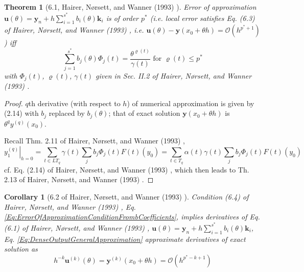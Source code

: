 \documentclass[10pt]{amsart}
\newtheorem{theorem}{Theorem}
\newtheorem{corollary}{Corollary}
\begin{document}
\begin{multicols*}{2}
\begin{theorem}[6.1, Hairer, N\o rsett, and Wanner (1993) \cite{HNW1993}]
Error of approximation $\mathbf{u}(\theta) = \mathbf{y}_n + h\sum_{i=1}^{s^*} b_i(\theta) \mathbf{k}_i$ is of order $p^*$ (i.e. local error satisfies Eq. (6.3) of Hairer, N\o rsett, and Wanner (1993) \cite{HNW1993}, i.e. $\mathbf{u}(\theta) - \mathbf{y}(x_0 + \theta h) = \mathcal{O}(h^{p^* + 1})$) iff
\begin{equation}\label{Eq:ErrorOfApproximationConditionFrombCoefficients}
	\sum_{j=1}^{s^*} b_j(\theta) \Phi_j(t) = \frac{\theta^{\varrho(t)}}{\gamma(t)} \text{ for } \varrho(t) \leq p^*
\end{equation}
with $\Phi_j(t)$, $\varrho(t)$, $\gamma(t)$ given in Sec. II.2 of Hairer, N\o rsett, and Wanner (1993) \cite{HNW1993}.
\end{theorem}

\begin{proof}
	$q$th derivative (with respect to $h$) of numerical approximation is given by (2.14) with $b_j$ replaced by $b_j(\theta)$; that of exact solution $\mathbf{y}(x_0 + \theta h)$ is $\theta^q y^{(q)}(x_0)$.
	
Recall Thm. 2.11 of Hairer, N\o rsett, and Wanner (1993) \cite{HNW1993},
	\begin{equation}
		\left. y_1^{(q)} \right|_{h=0} = \sum_{t\in LT_q} \gamma(t) \sum_{j} b_j \Phi_j(t) F(t)(y_0) = \sum_{t\in T_q} \alpha(t) \gamma(t) \sum_j b_j \Phi_j(t) F(t)(y_0) 
	\end{equation}
cf. Eq. (2.14) of Hairer, N\o rsett, and Wanner (1993) \cite{HNW1993}, which then leads to Th. 2.13 of Hairer, N\o rsett, and Wanner (1993) \cite{HNW1993}.
\end{proof}

\begin{corollary}[6.2 of Hairer, N\o rsett, and Wanner (1993) \cite{HNW1993}]
	Condition (6.4) of Hairer, N\o rsett, and Wanner (1993) \cite{HNW1993}, Eq. \ref{Eq:ErrorOfApproximationConditionFrombCoefficients}, implies derivatives of Eq. (6.1) of Hairer, N\o rsett, and Wanner (1993) \cite{HNW1993}, $\mathbf{u}(\theta) = \mathbf{y}_n + h\sum_{i=1}^{s^*} b_i(\theta) \mathbf{k}_i$, Eq. \ref{Eq:DenseOutputGeneralApproximation} approximate derivatives of exact solution as
	\begin{equation}\label{Eq:DerivativesOfApproximationOrder}
		h^{-k} \mathbf{u}^{(k)}(\theta) = \mathbf{y}^{(k)}(x_0 + \theta h) = \mathcal{O}(h^{p^* -k + 1})
	\end{equation}
\end{corollary} 


\end{multicols*}
\end{document}

